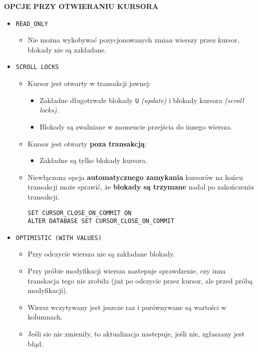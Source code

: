 \documentclass[a5paper,6pt]{article}
\begin{document}
    \textbf{OPCJE PRZY OTWIERANIU KURSORA}
    \begin{itemize}
        \item \texttt{READ\_ONLY}
        \begin{itemize}
            \item Nie można wykobywać pozycjonowanych zmian wierszy przez
                  kursor, blokady nie są zakładane.
        \end{itemize}

        \item \texttt{SCROLL LOCKS}
        \begin{itemize}
            \item Kursor jest otwarty w transakcji jawnej:
            \begin{itemize}
                \item Zakładne długotrwałe blokady \texttt{U} \textit{(update)}
                      i blokady kursora \textit{(scroll locks)}.
                \item Blokady są zwalniane w momencie przejścia do innego
                      wiersza.
            \end{itemize}

            \item Kursor jest otwarty \textbf{poza transakcją}:
            \begin{itemize}
                \item Zakładne są tylko blokady kursora.
            \end{itemize}

            \item Niewłączona opcja \textbf{automatycznego zamykania} kursorów
                  na końcu transakcji może sprawić, że
                  \textbf{blokady są trzymane} nadal po zakończeniu transakcji.

            \begin{verbatim}
SET CURSOR_CLOSE_ON_COMMIT ON
ALTER DATABASE SET CURSOR_CLOSE_ON_COMMIT
            \end{verbatim}
        \end{itemize}

        \item \texttt{OPTIMISTIC (WITH VALUES)}
        \begin{itemize}
            \item Przy odczycie wiersza nie są zakładane blokady.
            \item Przy próbie modyfikacji wiersza nastepuje sprawdzenie,
                  czy inna transkacja tego nie zrobiła (już po odczycie przez
                  kursor, ale przed próbą modyfikacji).
            \item Wiersz wczytywany jest jeszcze raz i porównywane są wartości
                  w kolumnach.
            \item Jeśli sie nie zmieniły, to aktualizacja nastepuje, jeśli nie,
                  zgłaszany jest błąd.
        \end{itemize}


\end{itemize}
\end{document}
